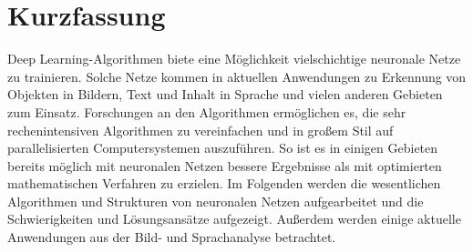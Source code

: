 \chapter{Kurzfassung}

Deep Learning-Algorithmen biete eine Möglichkeit vielschichtige neuronale Netze zu trainieren. Solche Netze kommen in aktuellen Anwendungen zu Erkennung von Objekten in Bildern, Text und Inhalt in Sprache und vielen anderen Gebieten zum Einsatz. Forschungen an den Algorithmen ermöglichen es, die sehr rechenintensiven Algorithmen zu vereinfachen und in großem Stil auf parallelisierten Computersystemen auszuführen. So ist es in einigen Gebieten bereits möglich mit neuronalen Netzen bessere Ergebnisse als mit optimierten mathematischen Verfahren zu erzielen. Im Folgenden werden die wesentlichen Algorithmen und Strukturen von neuronalen Netzen aufgearbeitet und die Schwierigkeiten und Lösungsansätze aufgezeigt. Außerdem werden einige aktuelle Anwendungen aus der Bild- und Sprachanalyse betrachtet.